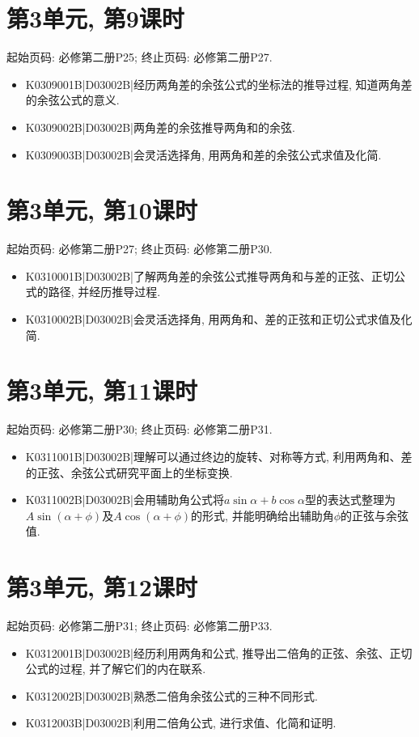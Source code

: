 \section*{第3单元, 第9课时}
起始页码: 必修第二册P25; 终止页码: 必修第二册P27.
\begin{itemize}
\item K0309001B|D03002B|经历两角差的余弦公式的坐标法的推导过程, 知道两角差的余弦公式的意义.
\item K0309002B|D03002B|两角差的余弦推导两角和的余弦.
\item K0309003B|D03002B|会灵活选择角, 用两角和差的余弦公式求值及化简.
\end{itemize}

\section*{第3单元, 第10课时}
起始页码: 必修第二册P27; 终止页码: 必修第二册P30.
\begin{itemize}
\item K0310001B|D03002B|了解两角差的余弦公式推导两角和与差的正弦、正切公式的路径, 并经历推导过程.
\item K0310002B|D03002B|会灵活选择角, 用两角和、差的正弦和正切公式求值及化简.
\end{itemize}

\section*{第3单元, 第11课时}
起始页码: 必修第二册P30; 终止页码: 必修第二册P31.
\begin{itemize}
\item K0311001B|D03002B|理解可以通过终边的旋转、对称等方式, 利用两角和、差的正弦、余弦公式研究平面上的坐标变换.
\item K0311002B|D03002B|会用辅助角公式将$a\sin\alpha+b\cos\alpha$型的表达式整理为$A\sin(\alpha+\phi)$及$A\cos(\alpha+\phi)$的形式, 并能明确给出辅助角$\phi$的正弦与余弦值.
\end{itemize}

\section*{第3单元, 第12课时}
起始页码: 必修第二册P31; 终止页码: 必修第二册P33.
\begin{itemize}
\item K0312001B|D03002B|经历利用两角和公式, 推导出二倍角的正弦、余弦、正切公式的过程, 并了解它们的内在联系.
\item K0312002B|D03002B|熟悉二倍角余弦公式的三种不同形式.
\item K0312003B|D03002B|利用二倍角公式, 进行求值、化简和证明.
\end{itemize}

